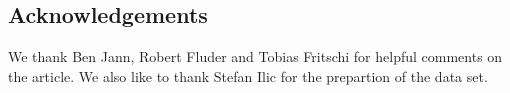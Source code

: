\documentclass[twoside]{article}\usepackage[]{graphicx}\usepackage[]{color}
\begin{document}
\begin{multicols}{2}









\section{Acknowledgements}

We thank Ben Jann, Robert Fluder and Tobias Fritschi for helpful comments on the article. We also like to thank Stefan Ilic for the prepartion of the data set.




\end{multicols}
\end{document}
